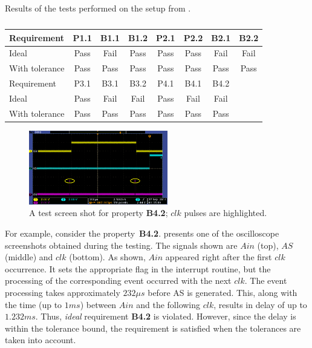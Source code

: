 \begin{table}[!b]
Results of the tests performed on the setup from .

{
\begin{tabular}{|l|c|c|c|c|c|c|c|}
\hline
Requirement 		& P1.1 & B1.1 & B1.2 & P2.1 & P2.2 & B2.1 & B2.2 \\\hline
Ideal 					& Pass & Fail & Pass & Pass & Pass & Fail & Fail \\\hline
With tolerance 	& Pass & Pass & Pass & Pass & Pass & Pass & Pass \\\hline
\hline
Requirement 		& P3.1 & B3.1 & B3.2 & P4.1 & B4.1 & B4.2 &\\\hline
Ideal 					& Pass & Fail & Fail & Pass & Fail & Fail &\\\hline
With tolerance 	& Pass & Pass & Pass & Pass & Pass & Pass &\\\hline
\end{tabular}}
\caption{}
\label{tab:test_results}
\end{table}


\begin{figure} [!t]
\center
		\includegraphics[width=0.54\textwidth]{figs/tek00003_new1.png}
\caption{A test screen shot for property \textbf{B4.2}; $clk$ pulses are highlighted.}
\label{fig:screen1}
\end{figure}


For example, consider the property~\textbf{B4.2}.  presents one of the oscilloscope screenshots obtained during the testing. The signals shown are $Ain$ (top), $AS$ (middle) and $clk$ (bottom). As shown, $Ain$ appeared right after the first $clk$ occurrence. It sets the appropriate flag in the interrupt routine, but the processing of the corresponding event occurred with the next $clk$. The event processing takes approximately $232 \mu s$ before AS is generated. This, along with the time (up to $1 ms$) between $Ain$ and the following $clk$, results in delay of up to $1.232 ms$. Thus, \textit{ideal} requirement \textbf{B4.2} is violated. However, since the delay is within the tolerance bound, the requirement is satisfied when the tolerances are taken into account.



